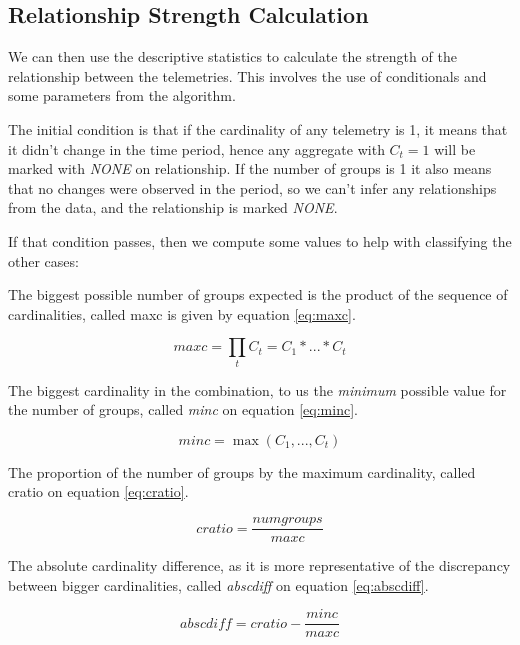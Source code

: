 \hypertarget{relationship-strength-calculation}{%
\subsection{Relationship Strength Calculation}\label{ch:querypart:heur:rel}}

We can then use the descriptive statistics to calculate the strength of the relationship between the telemetries.
This involves the use of conditionals and some parameters from the algorithm.

The initial condition is that if the cardinality of any telemetry is 1, it means that it didn't change in the time period, hence any aggregate with \(C_t=1\) will be marked with \emph{NONE} on relationship.
If the number of groups is 1 it also means that no changes were observed in the period, so we can't infer any relationships from the data, and the relationship is marked \emph{NONE}.

If that condition passes, then we compute some values to help with classifying the other cases:

The biggest possible number of groups expected is the product of the sequence of cardinalities, called maxc is given by equation \ref{eq:maxc}.

\begin{equation} \label{eq:maxc}
    maxc = \prod_{t}C_t = C_1 * ... * C_t
\end{equation}

The biggest cardinality in the combination, to us the \emph{minimum} possible value for the number of groups, called \emph{minc} on equation \ref{eq:minc}.

\begin{equation} \label{eq:minc}
    minc = \max(C_1,...,C_t)
\end{equation}

The proportion of the number of groups by the maximum cardinality, called cratio on equation \ref{eq:cratio}.

\begin{equation} \label{eq:cratio}
    cratio = \frac{numgroups}{maxc}
\end{equation}

The absolute cardinality difference, as it is more representative of the discrepancy between bigger cardinalities, called \emph{abscdiff} on equation \ref{eq:abscdiff}.

\begin{equation} \label{eq:abscdiff}
    abscdiff = cratio - \frac{minc}{maxc}
\end{equation}

